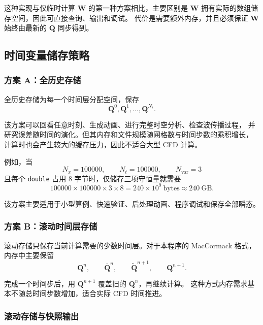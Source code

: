 这种实现与仅临时计算 $\bm{W}$ 的第一种方案相比，主要区别是
$\bm{W}$ 拥有实际的数组储存空间，因此可直接查询、输出和调试。
代价是需要额外内存，并且必须保证 $\bm{W}$ 始终由最新的 $\bm{Q}$ 同步得到。

\subsection{时间变量储存策略}

\subsubsection{方案 A：全历史存储}

全历史存储为每一个时间层分配空间，保存
\begin{equation}
\bm{Q}^{0},\bm{Q}^{1},\ldots,\bm{Q}^{N_t}.
\end{equation}

该方案可以回看任意时刻、生成动画、进行完整时空分析、检查波传播过程，
并研究误差随时间的演化。但其内存和文件规模随网格数与时间步数的乘积增长，
计算时也会产生较大的缓存压力，因此不适合大型 CFD 计算。

例如，当
\begin{equation}
N_x=100000,\qquad
N_t=100000,\qquad
N_{\mathrm{var}}=3
\end{equation}
且每个 \texttt{double} 占用 $8$ 字节时，仅储存三项守恒量就需要
\begin{equation}
100000\times100000\times3\times8
=240\times10^9\ \text{bytes}
\approx240\ \text{GB}.
\end{equation}

该方案主要适用于小型算例、快速验证、后处理动画、程序调试和保存全部瞬态。

\subsubsection{方案 B：滚动时间层存储}

滚动存储只保存当前计算需要的少数时间层。对于本程序的 MacCormack 格式，
内存中主要保留
\begin{equation}
\bm{Q}^{n},
\qquad
\bar{\bm{Q}}^{n},
\qquad
\widetilde{\bm{Q}}^{n+1},
\qquad
\bm{Q}^{n+1}.
\end{equation}

完成一个时间步后，用 $\bm{Q}^{n+1}$ 覆盖旧的 $\bm{Q}^{n}$，再继续计算。
这种方式内存需求基本不随总时间步数增加，适合实际 CFD 时间推进。

\subsubsection{滚动存储与快照输出}

